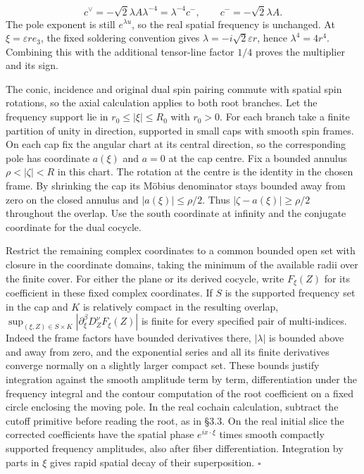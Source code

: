 \documentclass[
  english,
  11pt,
  reqno]{amsart}
\begin{document}
\label{eq:online-negative-dual-plane-root-coefficients}
\[
c^\vee=-\sqrt2\lambda A\lambda^{-4}
=\lambda^{-4}c^-,
\qquad c^-=-\sqrt2\lambda A.
\] The pole exponent is still \(e^{\lambda u}\), so the real spatial
frequency is unchanged. At \(\xi=\varepsilon r e_3\), the fixed
soldering convention gives \(\lambda=-i\sqrt2\varepsilon r\), hence
\(\lambda^4=4r^4\). Combining this with the additional tensor-line
factor \(1/4\) proves the multiplier and its sign.

The conic, incidence and original dual spin pairing commute with spatial
spin rotations, so the axial calculation applies to both root branches.
Let the frequency support lie in \(r_0\le |\xi|\le R_0\) with \(r_0>0\).
For each branch take a finite partition of unity in direction, supported
in small caps with smooth spin frames. On each cap fix the angular chart
at its central direction, so the corresponding pole has coordinate
\(a(\xi)\) and \(a=0\) at the cap centre. Fix a bounded annulus
\(\rho<|\zeta|<R\) in this chart. The rotation at the centre is the
identity in the chosen frame. By shrinking the cap its Möbius
denominator stays bounded away from zero on the closed annulus and
\(|a(\xi)|\le\rho/2\). Thus \(|\zeta-a(\xi)|\ge\rho/2\) throughout the
overlap. Use the south coordinate at infinity and the conjugate
coordinate for the dual cocycle.

Restrict the remaining complex coordinates to a common bounded open set
with closure in the coordinate domains, taking the minimum of the
available radii over the finite cover. For either the plane or its
derived cocycle, write \(F_\xi(Z)\) for its coefficient in these fixed
complex coordinates. If \(S\) is the supported frequency set in the cap
and \(K\) is relatively compact in the resulting overlap,
\(\sup_{(\xi,Z)\in S\times K}|\partial_\xi^\beta D_Z^\nu F_\xi(Z)|\) is
finite for every specified pair of multi-indices. Indeed the frame
factors have bounded derivatives there, \(|\lambda|\) is bounded above
and away from zero, and the exponential series and all its finite
derivatives converge normally on a slightly larger compact set. These
bounds justify integration against the smooth amplitude term by term,
differentiation under the frequency integral and the contour computation
of the root coefficient on a fixed circle enclosing the moving pole. In
the real cochain calculation, subtract the cutoff primitive before
reading the root, as in §3.3. On the real initial slice the corrected
coefficients have the spatial phase \(e^{ix\cdot\xi}\) times smooth
compactly supported frequency amplitudes, also after fiber
differentiation. Integration by parts in \(\xi\) gives rapid spatial
decay of their superposition. \hfill\(\square\)
\end{document}
